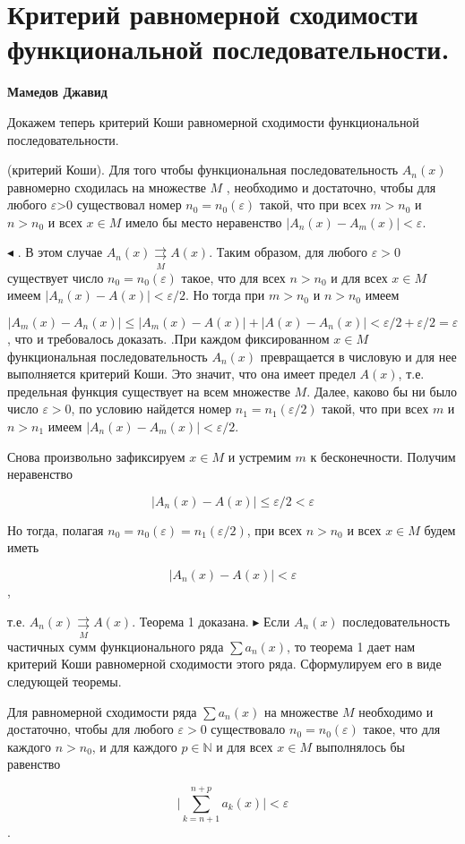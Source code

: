 \setcounter{theorem}{0}
\setcounter{example}{0}
\setcounter{task}{0}

\chapter{Критерий  равномерной сходимости функциональной последовательности.}
\vskip 7mm
    \centerline{\bf Мамедов Джавид} \vskip 1cm
    Докажем теперь критерий Коши равномерной сходимости функциональной последовательности.
\vskip 5mm

\begin{theorem}
(критерий Коши). Для того чтобы функциональная последовательность  $ A_n(x) $  равномерно сходилась на множестве $M$ , необходимо и достаточно, чтобы для любого $\varepsilon$>0 существовал номер $n_0=n_0(\varepsilon)$
такой, что при всех $m>n_0$ и $n>n_0$ и всех $x\in M$ имело бы место неравенство $|A_n(x)-A_m(x)|<\varepsilon$.
\end{theorem}
\vskip 5mm
$\blacktriangleleft$
{}. В этом случае $A_n(x) \underset{M}{\rightrightarrows} A(x)$.
 Таким образом, для любого $\varepsilon>0$ существует число $n_0=n_0(\varepsilon)$ такое, что для всех $n>n_0$ и для всех $x\in M$ имеем $|A_n(x)-A(x)|<\varepsilon/2$. Но тогда
при $m>n_0$ и $n>n_0$ имеем

\vskip 5mm

$$|A_m(x)-A_n(x)|\le|A_m(x)-A(x)|+|A(x)-A_n(x)|<\varepsilon/2 + \varepsilon/2 =\varepsilon$$,
\vskip 5mm
что и требовалось доказать.
\vskip 5mm
{}.При каждом фиксированном $x\in M$ функциональная последовательность $A_n(x)$ превращается в числовую и для нее выполняется критерий Коши. Это значит, что она имеет предел $A(x)$,
 т.е. предельная функция существует на всем множестве $M$. Далее, каково бы ни было число $\varepsilon>0$, по условию найдется номер $n_1=n_1(\varepsilon/2)$ такой, что при всех $m$ и $n>n_1$ имеем
$|A_n(x)-A_m(x)|<\varepsilon/2$.

Снова произвольно зафиксируем $x\in M$ и устремим $m$ к бесконечности. Получим неравенство
\vskip 5mm

$$|A_n(x)-A(x)|\le\varepsilon/2<\varepsilon$$

Но тогда, полагая $n_0=n_0(\varepsilon)=n_1(\varepsilon/2)$, при всех $n>n_0$ и всех $x\in M$ 
будем иметь 

$$|A_n(x)-A(x)|<\varepsilon$$,

 т.е. $A_n(x) \underset{M}{\rightrightarrows} A(x)$. Теорема 1 доказана.
$\blacktriangleright$
Если $A_n(x)$ \texttwelveudash последовательность частичных сумм функционального ряда $\sum a_n(x)$, то теорема 1 дает нам критерий Коши равномерной сходимости этого ряда. Сформулируем его в виде следующей теоремы.
\vskip 5mm
\begin{theorem}
Для равномерной сходимости ряда $\sum a_n(x)$ на множестве $M$ необходимо и достаточно, чтобы для любого $\varepsilon>0$ существовало $n_0=n_0(\varepsilon)$ такое, что для каждого $n>n_0$, и для каждого $p\in \mathbb N$ и для всех $x\in M$ выполнялось бы равенство

$$\Biggl|\sum_{k=n+1}^{n+p}a_k(x)\Biggr|<\varepsilon$$.
\end{theorem}

